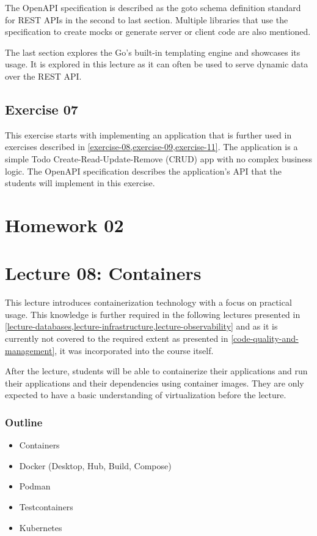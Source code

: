 \documentclass[
  digital,
  color,
  oneside,
  nosansbold,
  nocolorbold,
  nolof,
  nolot,
]{fithesis4}
\begin{document}
The OpenAPI specification is described as the goto schema definition standard for REST APIs in the second to last section. Multiple libraries that use the specification to create mocks or generate server or client code are also mentioned.

The last section explores the Go's built-in templating engine and showcases its usage. It is explored in this lecture as it can often be used to serve dynamic data over the REST API.

\subsection{Exercise 07}\label{exercise-07}

This exercise starts with implementing an application that is further used in exercises described in \cref{exercise-08,exercise-09,exercise-11}. The application is a simple Todo Create-Read-Update-Remove (CRUD) app with no complex business logic. The OpenAPI\cite{open-api} specification describes the application's API that the students will implement in this exercise.

\section{Homework 02}

\section{Lecture 08: Containers}\label{lecture-containers}

This lecture introduces containerization technology with a focus on practical usage. This knowledge is further required in the following lectures presented in \cref{lecture-databases,lecture-infrastructure,lecture-observability} and as it is currently not covered to the required extent as presented in \cref{code-quality-and-management}, it was incorporated into the course itself.

After the lecture, students will be able to containerize their applications and run their applications and their dependencies using container images. They are only expected to have a basic understanding of virtualization before the lecture.

\subsubsection{Outline}

\begin{itemize}
    \item Containers
    \item Docker (Desktop, Hub, Build, Compose)
    \item Podman
    \item Testcontainers
    \item Kubernetes
\end{itemize}
\end{document}
